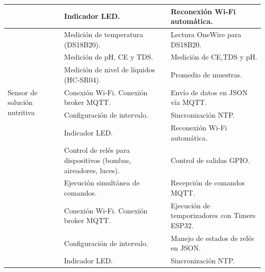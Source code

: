 \begin{table}[H]
\begin{tabular}{p{1.5cm}p{5.4cm}p{5.5cm}}
                                                          & Indicador LED.                                                  & Reconexión Wi-Fi automática.                    \\
        \midrule
        \multirow{7}{1.5cm}{Sensor de solución nutritiva} & Medición de temperatura (DS18B20).                              & Lectura OneWire para DS18B20.                   \\
                                                          & Medición de pH, CE y TDS.                                       & Medición de CE,TDS y pH.                        \\
                                                          & Medición de nivel de líquidos (HC-SR04).                        & Promedio de muestras.                           \\
                                                          & Conexión Wi-Fi.                     Conexión broker MQTT.       & Envío de datos en JSON vía MQTT.                \\
                                                          & Configuración de intervalo.                                     & Sincronización NTP.                             \\
                                                          & Indicador LED.                                                  & Reconexión Wi-Fi automática.                    \\
        \midrule
        \multirow{7}{1.5cm}{Actuador}                     & Control de relés para dispositivos (bombas, aireadores, luces). & Control de salidas GPIO.                        \\
                                                          & Ejecución simultánea de comandos.                               & Recepción de comandos MQTT.                     \\
                                                          & Conexión Wi-Fi.                     Conexión broker MQTT.       & Ejecución de temporizadores con Timers ESP32.   \\
                                                          & Configuración de intervalo.                                     & Manejo de estados de relés en JSON.             \\
                                                          & Indicador LED.                                                  & Sincronización NTP.                             \\
        \bottomrule
        \hline
    \end{tabular}
    \label{tab:nodos_iot}
\end{table}

